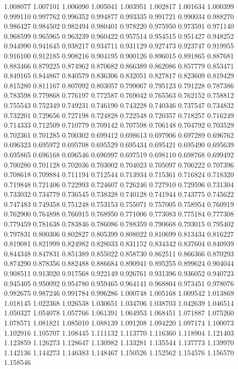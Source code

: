 1.008077
1.007101
1.006090
1.005041
1.003951
1.002817
1.001634
1.000399
0.999110
0.997762
0.996352
0.994877
0.993335
0.991721
0.990034
0.988270
0.986427
0.984502
0.982494
0.980401
0.978220
0.975950
0.973591
0.971140
0.968599
0.965965
0.963239
0.960422
0.957514
0.954515
0.951427
0.948252
0.944990
0.941645
0.938217
0.934711
0.931129
0.927473
0.923747
0.919955
0.916100
0.912185
0.908216
0.904195
0.900126
0.896015
0.891865
0.887681
0.883466
0.879225
0.874962
0.870682
0.866389
0.862086
0.857779
0.853471
0.849165
0.844867
0.840579
0.836306
0.832051
0.827817
0.823609
0.819429
0.815280
0.811167
0.807092
0.803057
0.799067
0.795123
0.791228
0.787386
0.783598
0.779868
0.776197
0.772587
0.769042
0.765563
0.762152
0.758812
0.755543
0.752349
0.749231
0.746190
0.743228
0.740346
0.737547
0.734832
0.732201
0.729656
0.727198
0.724828
0.722548
0.720357
0.718257
0.716249
0.714333
0.712509
0.710779
0.709142
0.707598
0.706148
0.704792
0.703529
0.702361
0.701285
0.700302
0.699412
0.698613
0.697906
0.697289
0.696762
0.696323
0.695972
0.695708
0.695529
0.695434
0.695421
0.695490
0.695639
0.695865
0.696168
0.696546
0.696997
0.697519
0.698110
0.698768
0.699492
0.700280
0.701128
0.702036
0.703002
0.704023
0.705097
0.706222
0.707396
0.708618
0.709884
0.711194
0.712544
0.713934
0.715361
0.716824
0.718320
0.719848
0.721406
0.722993
0.724607
0.726246
0.727910
0.729596
0.731304
0.733032
0.734779
0.736545
0.738328
0.740128
0.741944
0.743775
0.745622
0.747483
0.749358
0.751248
0.753153
0.755071
0.757005
0.758954
0.760919
0.762900
0.764898
0.766915
0.768950
0.771006
0.773083
0.775184
0.777308
0.779459
0.781638
0.783846
0.786086
0.788359
0.790668
0.793015
0.795402
0.797831
0.800306
0.802827
0.805399
0.808022
0.810699
0.813434
0.816227
0.819081
0.821999
0.824982
0.828033
0.831152
0.834342
0.837604
0.840939
0.844348
0.847831
0.851389
0.855022
0.858730
0.862511
0.866366
0.870293
0.874290
0.878356
0.882488
0.886684
0.890941
0.895255
0.899624
0.904044
0.908511
0.913020
0.917568
0.922149
0.926761
0.931396
0.936052
0.940723
0.945405
0.950092
0.954780
0.959465
0.964141
0.968804
0.973451
0.978076
0.982675
0.987246
0.991784
0.996286
1.000748
1.005168
1.009542
1.013869
1.018145
1.022368
1.026538
1.030651
1.034706
1.038703
1.042639
1.046514
1.050327
1.054078
1.057766
1.061391
1.064953
1.068451
1.071887
1.075260
1.078571
1.081821
1.085010
1.088139
1.091208
1.094220
1.097174
1.100073
1.102916
1.105707
1.108445
1.111132
1.113770
1.116360
1.118904
1.121403
1.123859
1.126273
1.128647
1.130982
1.133281
1.135544
1.137773
1.139970
1.142136
1.144273
1.146383
1.148467
1.150526
1.152562
1.154576
1.156570
1.158546
